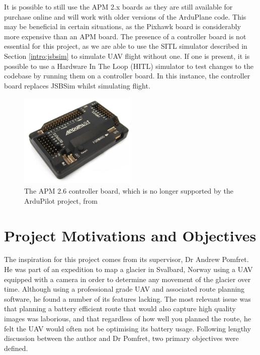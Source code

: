 It is possible to still use the APM 2.x boards as they are still available for purchase online and will work with older versions of the ArduPlane code. This may be beneficial in certain situations, as the Pixhawk board is considerably more expensive than an APM board. The presence of a controller board is not essential for this project, as we are able to use the SITL simulator described in Section \ref{intro:jsbsim} to simulate UAV flight without one. If one is present, it is possible to use a Hardware In The Loop (HITL) simulator to test changes to the codebase by running them on a controller board. In this instance, the controller board replaces JSBSim whilst simulating flight.

\begin{figure}[htbp!] 
\centering    
\includegraphics[width=0.5\textwidth]{APM2}
\caption[APM 2.6 Controller Board]{The APM 2.6 controller board, which is no longer supported by the ArduPilot project, from \cite{Apm2}}
\label{fig:apm2}
\end{figure}

\section{Project Motivations and Objectives} 
\label{intro:objectives}

The inspiration for this project comes from its supervisor, Dr Andrew Pomfret. He was part of an expedition to map a glacier in Svalbard, Norway using a UAV equipped with a camera in order to determine any movement of the glacier over time. Although using a professional grade UAV and associated route planning software, he found a number of its features lacking. The most relevant issue was that planning a battery efficient route that would also capture high quality images was laborious, and that regardless of how well you planned the route, he felt the UAV would often not be optimising its battery usage. Following lengthy discussion between the author and Dr Pomfret, two primary objectives were defined.


